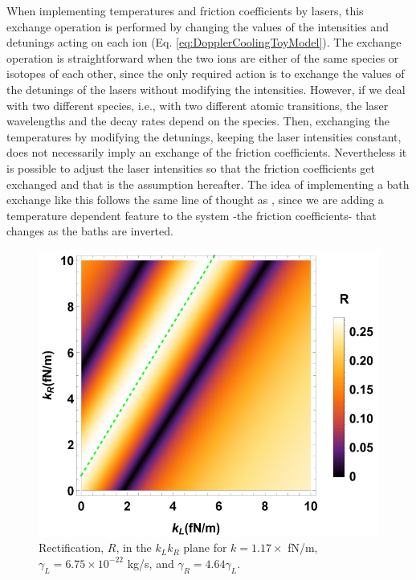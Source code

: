 When implementing temperatures and friction coefficients by lasers, this exchange operation is performed by changing the values of the intensities and detunings acting on each ion (Eq. \eqref{eq:DopplerCoolingToyModel}). The exchange operation is straightforward when the two ions are either of the same species or isotopes of each other, since the only required action is to exchange the values of the detunings of the lasers without modifying the intensities. However, if we deal with two different species, i.e., with two different atomic transitions, the laser wavelengths and the decay rates  depend on the species. Then, exchanging the temperatures by modifying the detunings, keeping the laser intensities constant, does not necessarily imply an exchange of the friction coefficients. Nevertheless it is possible to adjust the laser intensities so that the friction coefficients get exchanged and that is the assumption hereafter. The idea of implementing a bath exchange like this follows the same line of thought as \cite{Pereira2017}, since we are adding a temperature dependent feature to the system -the friction coefficients- that changes as the baths are inverted.

\begin{figure}
  \centering
  \includegraphics[width=\linewidth]{Figures/RwMPlota.pdf}
  \caption{Rectification, $R$, in the $k_L k_R$ plane for $k = 1.17 \times$ fN/m, $\gamma_L = 6.75\times 10^{-22}$ kg/s, and $\gamma_R = 4.64\gamma_L$.}
  \label{fig:Fig_rectification_K_plane}
\end{figure}

